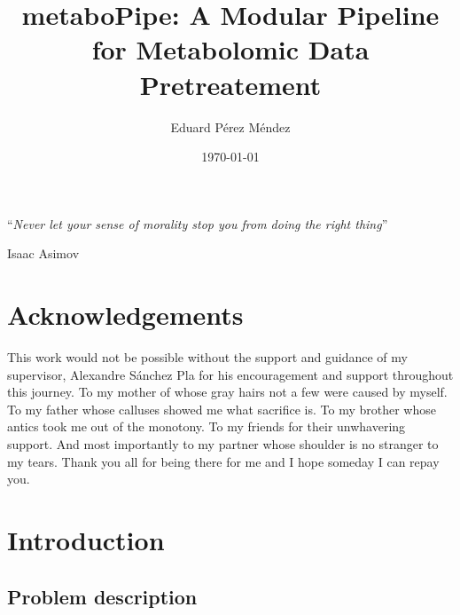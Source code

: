 \documentclass[ENG, BIB]{TFUOC}%
\title{metaboPipe: A Modular Pipeline for Metabolomic Data Pretreatement}
\author{Eduard Pérez Méndez}
\date{\today}
\begin{document}
\estructura

\newpage\null\thispagestyle{empty}

\vspace*{0.4\textheight}

\noindent\enquote{\itshape Never let your sense of morality stop you from doing the right thing}\bigbreak




\hfill Isaac Asimov

\newpage

\chapter*{Acknowledgements}
\vspace*{5cm}
This work would not be possible without the support and guidance of my supervisor, Alexandre Sánchez Pla for his encouragement and support throughout this journey. To my mother of whose gray hairs not a few were caused by myself. To my father whose calluses showed me what sacrifice is. To my brother whose antics took me out of the monotony. To my friends for their unwhavering support. And most importantly to my partner whose shoulder is no stranger to my tears. Thank you all for being there for me and I hope someday I can repay you.
\vspace*{\fill}
\newpage

\tableofcontents

\listoffigures

\listoftables



\chapter{Introduction}

\section{Problem description}
\end{document}

